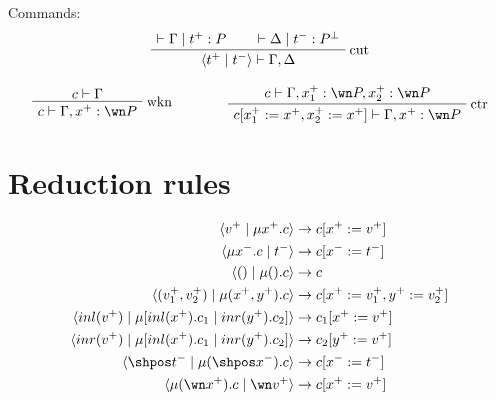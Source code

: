 Commands:
\begin{gather*}
\AxRule{\vdash \Gamma \mid t^+ : P}
\AxRule{\vdash \Delta \mid t^- : P\orth}
\LabelRule{\rulename{cut}}
\BinRule{\langle t^+ \mid t^-\rangle\vdash\Gamma, \Delta}
\DisplayProof
\\[2ex]
\AxRule{c \vdash \Gamma}
\LabelRule{\rulename{wkn}}
\UnaRule{c \vdash\Gamma, x^+: \wn P}
\DisplayProof
\qquad\qquad
\AxRule{c \vdash \Gamma, x_1^+:\wn P, x_2^+:\wn P}
\LabelRule{\rulename{ctr}}
\UnaRule{c[x_1^+ := x^+, x_2^+ := x^+] \vdash\Gamma, x^+: \wn P}
\DisplayProof
\end{gather*}

\section{Reduction rules}\label{reduction-rules}

\begin{align*}
\langle v^+ \mid \mu x^+.c \rangle &\rightarrow c[ x^+ := v^+] \\
\langle \mu x^-.c \mid t^- \rangle &\rightarrow c[x^- := t^-] \\
\langle () \mid \mu().c \rangle &\rightarrow c \\
\langle (v_1^+, v_2^+) \mid \mu(x^+, y^+).c \rangle &\rightarrow c[x^+ := v_1^+, y^+ := v_2^+] \\
\langle inl(v^+) \mid \mu[inl(x^+).c_1 \mid inr(y^+).c_2] \rangle &\rightarrow c_1[x^+ := v^+] \\
\langle inr(v^+) \mid \mu[inl(x^+).c_1 \mid inr(y^+).c_2] \rangle &\rightarrow c_2[y^+ := v^+] \\
\langle \shpos t^- \mid \mu(\shpos x^-).c \rangle &\rightarrow c[x^- := t^-] \\
\langle \mu(\wn x^+).c \mid \wn v^+ \rangle &\rightarrow c[x^+ := v^+]
\end{align*}


